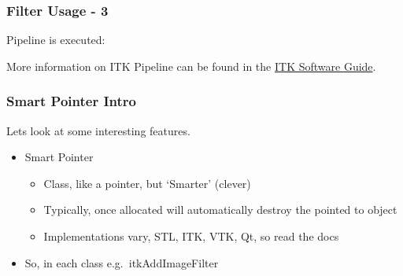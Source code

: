 \subsubsection{Filter Usage - 3}\label{filter-usage---3}

Pipeline is executed:

\begin{Shaded}
\begin{Highlighting}[]

  \NormalTok{);}
  \NormalTok{);}
  \NormalTok{);}
   \NormalTok{;}
\NormalTok{\}}
\end{Highlighting}
\end{Shaded}

More information on ITK Pipeline can be found in the
\href{http://www.itk.org/ItkSoftwareGuide.pdf}{ITK Software Guide}.

\subsubsection{Smart Pointer Intro}\label{smart-pointer-intro}

Lets look at some interesting features.

\begin{itemize}
\itemsep1pt\parskip0pt
\item
  Smart Pointer

  \begin{itemize}
  \itemsep1pt\parskip0pt
  \item
    Class, like a pointer, but `Smarter' (clever)
  \item
    Typically, once allocated will automatically destroy the pointed to
    object
  \item
    Implementations vary, STL, ITK, VTK, Qt, so read the docs
  \end{itemize}
\item
  So, in each class e.g.~itkAddImageFilter
\end{itemize}

